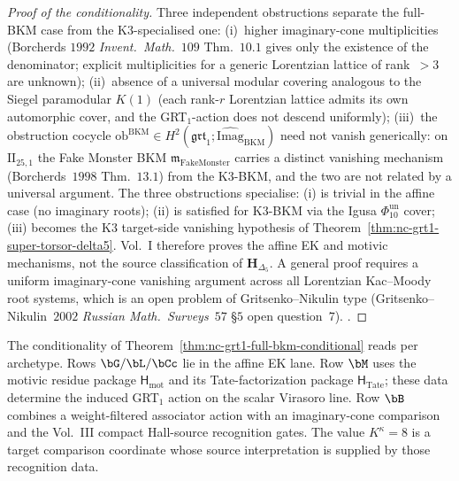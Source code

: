 \begin{proof}[Proof of the conditionality]
Three independent obstructions separate the full-BKM case from the
K$3$-specialised one: (i)~higher imaginary-cone multiplicities
\textup{(}Borcherds $1992$ \emph{Invent.\ Math.}~$109$ Thm.~$10.1$
gives only the existence of the denominator; explicit multiplicities
for a generic Lorentzian lattice of rank~$> 3$ are unknown\textup{)};
(ii)~absence of a universal modular covering analogous to the
Siegel paramodular $K(1)$ \textup{(}each rank-$r$ Lorentzian lattice
admits its own automorphic cover, and the GRT$_1$-action does not
descend uniformly\textup{)}; (iii)~the obstruction cocycle
$\mathrm{ob}^{\mathrm{BKM}} \in H^2(\mathfrak{grt}_1; \widehat{\mathrm{Imag}}_{\mathrm{BKM}})$
need not vanish generically: on $\mathrm{II}_{25, 1}$ the Fake Monster
BKM $\mathfrak m_{\mathrm{FakeMonster}}$ carries a distinct vanishing
mechanism \textup{(}Borcherds~$1998$ Thm.~$13.1$\textup{)} from the
K$3$-BKM, and the two are not related by a universal argument. The
three obstructions specialise: (i) is trivial in the affine case
(no imaginary roots); (ii) is satisfied for K$3$-BKM via the Igusa
$\Phi_{10}^{\mathrm{un}}$ cover; (iii) becomes the K$3$ target-side
vanishing hypothesis of
Theorem~\ref{thm:nc-grt1-super-torsor-delta5}. Vol.~I therefore proves
the affine EK and motivic mechanisms, not the source classification of
$\mathbf H_{\Delta_5}$. A general proof requires a uniform
imaginary-cone vanishing argument across all Lorentzian Kac--Moody root
systems, which is an open problem of Gritsenko--Nikulin type
\textup{(}Gritsenko--Nikulin~$2002$ \emph{Russian Math.\ Surveys}~$57$
\S$5$ open question~$7$\textup{)}.
\cite{Borcherds1992,Borcherds1998,GritsenkoNikulin1998,
 GritsenkoNikulin2002,EtingofKazhdan2000}.
\end{proof}

\begin{remark}
\label{rem:nc-grt1-status-per-row}
The conditionality of Theorem~\ref{thm:nc-grt1-full-bkm-conditional}
reads per archetype.  Rows $\bG/\bL/\bCc$ lie in the affine EK lane.
Row $\bM$ uses the motivic residue package
$\mathsf H_{\mathrm{mot}}$ and its Tate-factorization package
$\mathsf H_{\mathrm{Tate}}$; these data determine the induced
GRT$_1$ action on the scalar Virasoro line.  Row $\bB$ combines a
weight-filtered associator action with an imaginary-cone comparison
and the Vol.~III compact Hall-source recognition gates.  The value
$K^\kappa=8$ is a target comparison coordinate whose source
interpretation is supplied by those recognition data.
\end{remark}

